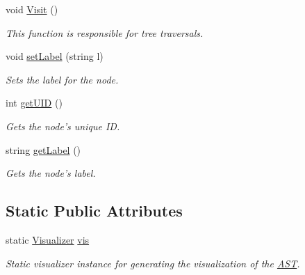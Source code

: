\begin{DoxyCompactItemize}
\item 
void \hyperlink{classAstPostfixExpr_ae3e7fdbd4c2bf888ee62760e6f422cad}{Visit} ()
\begin{DoxyCompactList}\small\item\em This function is responsible for tree traversals. \end{DoxyCompactList}\item 
void \hyperlink{classAST_a71d680856e95ff89f55d5311a552eba6}{set\-Label} (string l)
\begin{DoxyCompactList}\small\item\em Sets the label for the node. \end{DoxyCompactList}\item 
int \hyperlink{classAST_ab7a5b1d9f1c2de0d98deb356f724a42c}{get\-U\-I\-D} ()
\begin{DoxyCompactList}\small\item\em Gets the node's unique I\-D. \end{DoxyCompactList}\item 
string \hyperlink{classAST_aee029be902fffc927d16ccb03eb922ad}{get\-Label} ()
\begin{DoxyCompactList}\small\item\em Gets the node's label. \end{DoxyCompactList}\end{DoxyCompactItemize}
\subsection*{Static Public Attributes}
\begin{DoxyCompactItemize}
\item 
\hypertarget{classAST_aca9e6637209b31e03a09c0d42f29bdfa}{static \hyperlink{classVisualizer}{Visualizer} \hyperlink{classAST_aca9e6637209b31e03a09c0d42f29bdfa}{vis}}\label{classAST_aca9e6637209b31e03a09c0d42f29bdfa}

\begin{DoxyCompactList}\small\item\em Static visualizer instance for generating the visualization of the \hyperlink{classAST}{A\-S\-T}. \end{DoxyCompactList}\end{DoxyCompactItemize}
